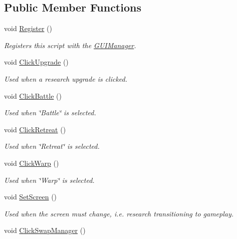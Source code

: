\subsection*{Public Member Functions}
\begin{DoxyCompactItemize}
\item 
void \hyperlink{class_custom_u_i_ad5d56f9392fa3c20db8b00ea8d29e03b}{Register} ()
\begin{DoxyCompactList}\small\item\em Registers this script with the \hyperlink{class_g_u_i_manager}{G\+U\+I\+Manager}. \end{DoxyCompactList}\item 
void \hyperlink{class_custom_u_i_a1c20d9fd3328e97b7c0319b1839e7dc6}{Click\+Upgrade} ()
\begin{DoxyCompactList}\small\item\em Used when a research upgrade is clicked. \end{DoxyCompactList}\item 
void \hyperlink{class_custom_u_i_a962a0b658c09ef8024828edb6f78d385}{Click\+Battle} ()
\begin{DoxyCompactList}\small\item\em Used when \char`\"{}\+Battle\char`\"{} is selected. \end{DoxyCompactList}\item 
void \hyperlink{class_custom_u_i_a38f12a2afe50b1f8a720848eadfb479c}{Click\+Retreat} ()
\begin{DoxyCompactList}\small\item\em Used when \char`\"{}\+Retreat\char`\"{} is selected. \end{DoxyCompactList}\item 
void \hyperlink{class_custom_u_i_ad559bb7548f7c6f3df566b67c95080f8}{Click\+Warp} ()
\begin{DoxyCompactList}\small\item\em Used when \char`\"{}\+Warp\char`\"{} is selected. \end{DoxyCompactList}\item 
void \hyperlink{class_custom_u_i_a0868fbe7f05babdcce3cb8131198381a}{Set\+Screen} ()
\begin{DoxyCompactList}\small\item\em Used when the screen must change, i.\+e. research transitioning to gameplay. \end{DoxyCompactList}\item 
void \hyperlink{class_custom_u_i_a0a3c2608b3e6c6ebe3ec4c86691ca7a3}{Click\+Swap\+Manager} ()

\end{DoxyCompactItemize}
